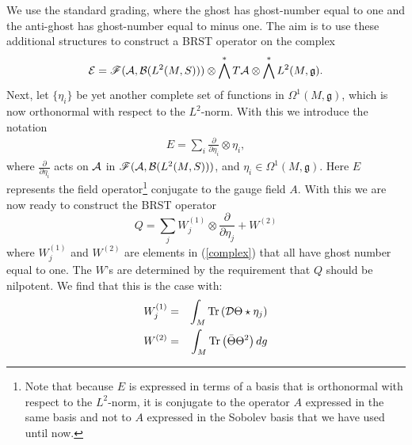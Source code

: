\documentclass[letterpaper,11pt]{article}
\newcommand{\nn}{\nonumber}
\def\d{\delta}
\def\OO{\Omega}
\def\ca{{\cal A}}
\def\cb{{\cal B}}
\def\cd{{\cal D}}
\def\ce{{\cal E}}
\def\cf{{\cal F}}
\newcommand{\pa}{\partial}
\begin{document}
We use the standard grading, where the ghost has ghost-number equal to one and the anti-ghost has ghost-number equal to minus one.
The aim is to use these additional structures to construct a BRST operator on the complex 
\begin{equation}
\ce=\mathscr{F} (\ca , \cb (L^2(M,S )) ) \otimes \bigwedge^* T\ca  \otimes \bigwedge^* L^2(M,\mathfrak{g}).
\label{complex}
\end{equation} 
%
Next, let $\{{\eta}_i\}$ be yet another complete set of functions in $\OO^1(M,\mathfrak{g})$, which is now orthonormal with respect to the $L^2$-norm. With this we introduce the notation
\begin{eqnarray}
E = \sum_i \frac{\pa}{\pa\eta_i} \otimes   \eta_i  ,
\nn
\end{eqnarray}
where $\frac{\pa}{\pa\eta_i}$ acts on $\ca$ in $\mathscr{F} (\ca , \cb (L^2(M,S )) )$, and $\eta_i\in \OO^1(M,\mathfrak{g}) 
$.
Here 
$E$ represents the field operator\footnote{Note that because $E$ is expressed in terms of a basis that is orthonormal with respect to the $L^2$-norm, it is conjugate to the operator $A$ expressed in the same basis and not to $A$ expressed in the Sobolev basis that we have used until now.}  conjugate to the gauge field $A$.
%
%
With this we are now ready to construct the BRST operator
$$
Q = \sum_j W^{(1)}_{j} \otimes \frac{\pa}{\pa {\eta}_j} + W^{(2)} %
$$
where $W^{(1)}_{j}$ and $W^{(2)}$ %
are elements in (\ref{complex}) that all have ghost number equal to one. The $W$'s are determined by the requirement that $Q$ should be nilpotent. We find that this is the case with: 
\begin{eqnarray}
W^{(1)}_{j} &=& \int_M \mbox{Tr} \left(\cd \Theta \star {\eta}_j\right)
\nn\\
W^{(2)} &=& \int_M \mbox{Tr} \left( \bar{\Theta} \Theta^2 \right) dg
\nn
\end{eqnarray}
\end{document}
